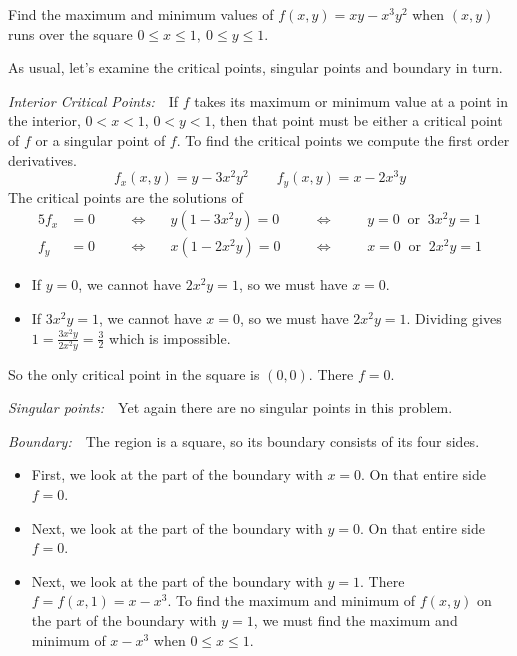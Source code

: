 \begin{eg}\label{eg:MXMNabsC}
Find the maximum and minimum values of $f(x,y)=xy-x^3y^2$ when $(x,y)$
runs over the square $0\le x\le 1,\ 0\le y\le 1$.
\goodbreak

\soln 
As usual, let's examine the critical points, singular points and boundary
in turn.

\noindent\emph{Interior Critical Points:}\ \ 
If $f$ takes its maximum or minimum value at a point in the interior, 
$0<x<1$, $0<y<1$, then that point must be either a critical point of $f$
or a singular point of $f$.
To find the critical points we compute the first order derivatives.
\begin{equation*}
f_x(x,y)=y-3x^2y^2\qquad
f_y(x,y)=x-2x^3y
\end{equation*}
The critical points are the solutions of
\begin{alignat*}{5}
f_x&=0 & &\quad\iff\quad  &y(1-3x^2y)=0 & 
         &\quad\iff\quad & &y=0 \ \text{ or }\  3x^2y=1 \\
f_y&=0 & &\quad\iff\quad  &x(1-2x^2y)=0 & 
          &\quad\iff\quad & &x=0 \ \text{ or }\  2x^2y=1 
\end{alignat*}
\begin{itemize}
\item 
If $y=0$, we cannot have $2x^2y=1$, so we must have $x=0$.
\item
If $3x^2y=1$, we cannot have $x=0$, so we must have $2x^2y=1$. Dividing
gives $1=\tfrac{3x^2y}{2x^2y}=\tfrac{3}{2}$ which is impossible.
\end{itemize}
So the only critical point in the square is $(0,0)$. There $f=0$.

\smallskip
\noindent\emph{Singular points:}\ \  Yet again there are no singular 
points in this problem.


\smallskip
\noindent\emph{Boundary:}\ \ 
The region is a square, so its boundary consists of its four sides.
\begin{itemize}
\item 
First, we look at the part of the boundary with $x=0$. On that entire 
       side $f=0$.
\item 
Next, we look at the part of the boundary with $y=0$. On that entire side 
  $f=0$.
\item
Next, we look at the part of the boundary with $y=1$. There $f=f(x,1)=x-x^3$.
To find the maximum and minimum of $f(x,y)$ on the part of the boundary
with $y=1$, we must find the maximum and minimum of $x-x^3$ when 
 $0\le x\le 1$. 


\end{itemize}
\end{eg}
